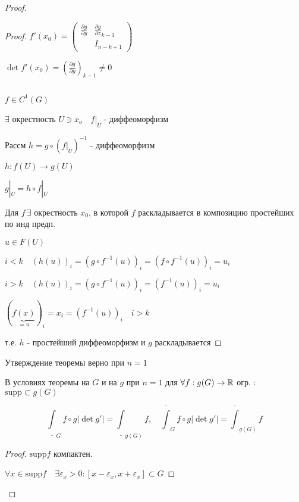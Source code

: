 \begin{proof}
\begin{proof}
        $f'(x_0) = \begin{pmatrix}
            \frac{\partial g}{\partial y} & \frac{\partial g}{\partial z}_{k-1} \\ 
            & I_{n - k + 1}
        \end{pmatrix}$

        $\det f'(x_0) = (\frac{\partial g}{\partial y})_{k-1} \neq 0$

        \par $ $

        $f \in C^1 (G)$

        $\exists$ окрестность $U \ni x_o \quad f|\underset{U}{ }$ - диффеоморфизм

        Рассм $h = g \circ (f|\underset{U}{ })^{-1}$ - диффеоморфизм

        $h : f(U) \to g(U)$

        $g|\underset{U}{ } = h \circ f|\underset{U}{ }$

        Для $f \, \exists$ окрестность $x_0$, в которой $f$ раскладывается в композицию
        простейших по инд предп. 

        $u \in F(U)$

        $i<k\quad (h(u))_i = (g \circ f^{-1}(u))_i = (f\circ f^{-1}(u))_i = u_i$

        $i>k\quad (h(u))_i = (g \circ f^{-1}(u))_i = (f^{-1}(u))_i = u_i$

        $(\underbrace{f(x)}_{=u})_i = x_i = (f^{-1}(u))_i \quad i>k$

        т.е. $h$ - простейший диффеоморфизм и $g$ раскладывается

    \end{proof}

    \begin{lemma} %
        Утверждение теоремы верно при $n=1$

        \begin{lemma} %
            В условиях теоремы на $G$ и на $g$ при $n=1$ для $\forall f: g(G)\to \mathbb{R}$ огр.
            : $\text{supp} \subset g(G)$

            $$\underline\int_G f\circ g |\det g'| = \underline\int_{g(G)}f 
            ,\quad
             \overline\int_G f\circ g |\det g'| = \overline\int_{g(G)} f
            $$
        \end{lemma}
        \begin{proof}
            $\text{supp}f$ компактен. 
            
            $\forall x \in \text{supp} f \quad \exists \varepsilon_x > 0 :
            [x - \varepsilon_x, x + \varepsilon_x] \subset G$


\end{proof}
\end{lemma}
\end{proof}
